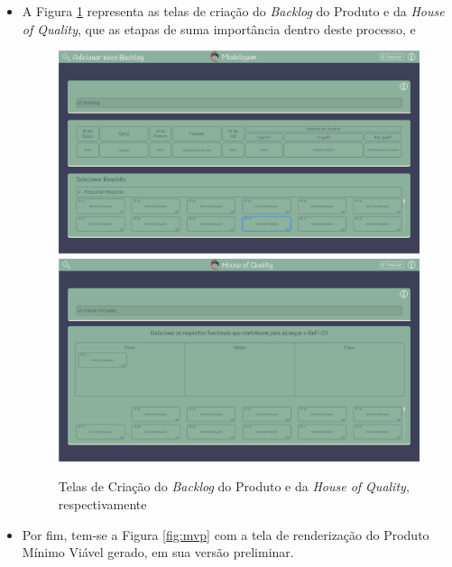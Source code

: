\begin{itemize}
\begin{figure}[]
\begin{center}
    \end{center}
    \end{figure}
    \item A Figura \ref{fig:backlog_prototipo} representa as telas de criação do \textit{Backlog} do Produto e da \textit{House of Quality}, que as etapas de suma importância dentro deste processo, e
    \begin{figure}[]
      \begin{center}
          \caption{{Telas de Criação do \textit{Backlog} do Produto e da \textit{House of Quality}, respectivamente}}
          \label{fig:backlog_prototipo}
          \includegraphics[scale=0.36]{figuras/Prototipo/backlog.png}
          \includegraphics[scale=0.36]{figuras/Prototipo/house-of-quality.png}
    \end{center}
    \end{figure}
    \item Por fim, tem-se a Figura \ref{fig:mvp} com a tela de renderização do Produto Mínimo Viável gerado, em sua versão preliminar.
    \begin{figure}[]

\end{figure}
\end{itemize}
